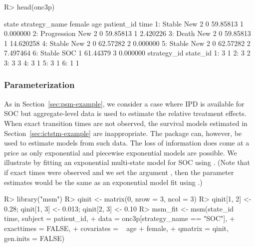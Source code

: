 \documentclass[article, nojss]{jss}\usepackage[]{graphicx}\usepackage[]{color}
\begin{document}
\begin{Schunk}
\begin{Sinput}
R> head(onc3p)
\end{Sinput}
\begin{Soutput}
         state strategy_name female      age patient_id      time
1:      Stable         New 2      0 59.85813          1  0.000000
2: Progression         New 2      0 59.85813          1  2.420226
3:       Death         New 2      0 59.85813          1 14.620258
4:      Stable         New 2      0 62.57282          2  0.000000
5:      Stable         New 2      0 62.57282          2  7.497464
6:      Stable           SOC      1 61.44379          3  0.000000
   strategy_id state_id
1:           3        1
2:           3        2
3:           3        3
4:           3        1
5:           3        1
6:           1        1
\end{Soutput}
\end{Schunk}

\subsubsection{Parameterization}
As in Section~\ref{sec:psm-example}, we consider a case where IPD is available for SOC but aggregate-level data is used to estimate the relative treatment effects. When exact transition times are not observed, the survival models estimated in Section~\ref{sec:ictstm-example} are inappropriate. The  package can, however, be used to estimate models from such data. The loss of information does come at a price as only exponential and piecewise exponential models are possible. We illustrate by fitting an exponential multi-state model for SOC using . (Note that if exact times were observed and we set the argument , then the parameter estimates would be the same as an exponential model fit using .)

\begin{Schunk}
\begin{Sinput}
R> library("msm")
R> qinit <- matrix(0, nrow = 3, ncol = 3)
R> qinit[1, 2] <-  0.28; qinit[1, 3] <-  0.013; qinit[2, 3] <-  0.10
R> msm_fit <- msm(state_id ~ time, subject = patient_id, 
+                 data = onc3p[strategy_name == "SOC"],
+                 exacttimes = FALSE,
+                 covariates = ~ age + female,
+                 qmatrix = qinit, gen.inits = FALSE)
\end{Sinput}
\end{Schunk}
\end{document}
